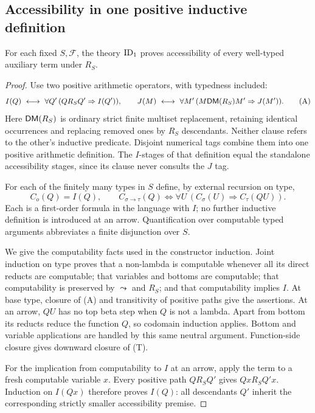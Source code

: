 \subsection{Accessibility in one positive inductive definition}
\begin{lemma}\label{lem:arithmetic-accessibility}
For each fixed $S,\mathcal F$, the theory $\mathrm{ID}_1$ proves accessibility
of every well-typed auxiliary term under $R_S$.
\end{lemma}
\begin{proof}
Use two positive arithmetic operators, with typedness included:
\[
 I(Q)\ \longleftrightarrow\
   \forall Q'\,(Q R_S Q'\Rightarrow I(Q')),
 \qquad
 J(M)\ \longleftrightarrow\
   \forall M'\,(M\mathsf{DM}(R_S)M'\Rightarrow J(M')).
 \tag{A}
\]
Here $\mathsf{DM}(R_S)$ is ordinary strict finite multiset replacement, retaining
identical occurrences and replacing removed ones by $R_S$ descendants.
Neither clause refers to the other's inductive predicate. Disjoint
numerical tags combine them into one positive arithmetic definition.
The $I$-stages of that definition equal the standalone accessibility
stages, since its clause never consults the $J$ tag.

For each of the finitely many types in $S$ define, by external recursion
on type,
\[
 C_o(Q)=I(Q),\qquad
 C_{\sigma\to\tau}(Q)\iff
       \forall U\,(C_\sigma(U)\Rightarrow C_\tau(QU)).
 \tag{T}
\]
Each is a first-order formula in the language with $I$; no further
inductive definition is introduced at an arrow. Quantification over
computable typed arguments abbreviates a finite disjunction over $S$.

We give the computability facts used in the constructor induction.
Joint induction on type proves that a non-lambda is computable whenever
all its direct reducts are computable; that variables and bottoms are
computable; that computability is preserved by $\leadsto$ and $R_S$;
and that computability implies $I$. At base type, closure of (A) and
transitivity of positive paths give the assertions. At an arrow, $QU$
has no top beta step when $Q$ is not a lambda. Apart from bottom its
reducts reduce the function $Q$, so codomain induction applies. Bottom
and variable applications are handled by this same neutral argument.
Function-side closure gives downward closure of (T).

For the implication from computability to $I$ at an arrow, apply the
term to a fresh computable variable $x$. Every positive path
$Q R_S Q'$ gives $Qx R_S Q'x$. Induction on $I(Qx)$ therefore proves
$I(Q)$: all descendants $Q'$ inherit the corresponding strictly
smaller accessibility premise.


\end{proof}
